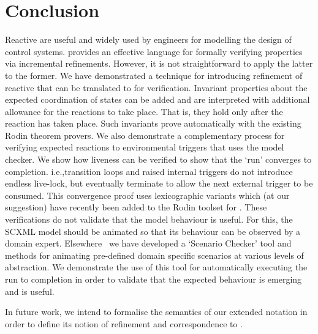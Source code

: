 \section{Conclusion}
\label{sec:conc}

Reactive \SCs are useful and widely used by engineers for modelling the design of control systems. 
\EventB provides an effective language for formally verifying properties via incremental refinements.
However, it is not straightforward to apply the latter to the former.
We have demonstrated a technique for introducing refinement of reactive \SCs that can be translated to \EventB for verification.
Invariant properties about the expected coordination of states can be added and are interpreted with additional allowance for the reactions to take place.
That is, they hold only after the reaction has taken place.
Such invariants prove automatically with the existing Rodin theorem provers.
We also demonstrate a complementary process for verifying expected reactions to environmental triggers that uses the \LTL model checker.
We show how liveness can be verified  to show that the `run' converges to completion.
i.e.,transition loops and raised internal triggers do not introduce endless live-lock, but eventually terminate to allow the next external trigger to be consumed.
This convergence proof uses lexicographic variants which (at our suggestion) have recently been added to the Rodin toolset for \EventB.
These verifications do not validate that the model behaviour is useful.
For this, the SCXML model should be animated so that its behaviour can be observed by a domain expert.
Elsewhere~\cite{snook20JSA} we have developed a `Scenario Checker' tool and methods for animating pre-defined domain specific scenarios at various levels of abstraction.
We demonstrate the use of this tool for automatically executing the run to completion in order to validate that the expected behaviour is emerging and is useful.

In future work, we intend to formalise the semantics of our extended \SCXML notation in order to define its notion of refinement and correspondence to \EventB. 



